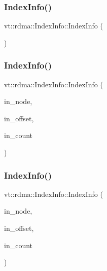 \subsubsection{\texorpdfstring{Index\+Info()}{IndexInfo()}\hspace{0.1cm}{\footnotesize\ttfamily [1/3]}}
{\footnotesize\ttfamily vt\+::rdma\+::\+Index\+Info\+::\+Index\+Info (\begin{DoxyParamCaption}{ }\end{DoxyParamCaption})\hspace{0.3cm}{\ttfamily [default]}}

\mbox{\label{structvt_1_1rdma_1_1_index_info_a3e2a60b3dbc28c2c67e6bbf6d5cdaba1}} 
\subsubsection{\texorpdfstring{Index\+Info()}{IndexInfo()}\hspace{0.1cm}{\footnotesize\ttfamily [2/3]}}
{\footnotesize\ttfamily vt\+::rdma\+::\+Index\+Info\+::\+Index\+Info (\begin{DoxyParamCaption}\item[{\hyperlink{namespacevt_a866da9d0efc19c0a1ce79e9e492f47e2}{vt\+::\+Node\+Type}}]{in\+\_\+node,  }\item[{uint64\+\_\+t}]{in\+\_\+offset,  }\item[{uint64\+\_\+t}]{in\+\_\+count }\end{DoxyParamCaption})\hspace{0.3cm}{\ttfamily [inline]}}

\mbox{\label{structvt_1_1rdma_1_1_index_info_a5722f4ee5d85747af1068b09506c8ff8}} 
\subsubsection{\texorpdfstring{Index\+Info()}{IndexInfo()}\hspace{0.1cm}{\footnotesize\ttfamily [3/3]}}
{\footnotesize\ttfamily vt\+::rdma\+::\+Index\+Info\+::\+Index\+Info (\begin{DoxyParamCaption}\item[{uint64\+\_\+t}]{in\+\_\+node,  }\item[{uint64\+\_\+t}]{in\+\_\+offset,  }\item[{uint64\+\_\+t}]{in\+\_\+count }\end{DoxyParamCaption})\hspace{0.3cm}{\ttfamily [inline]}}



